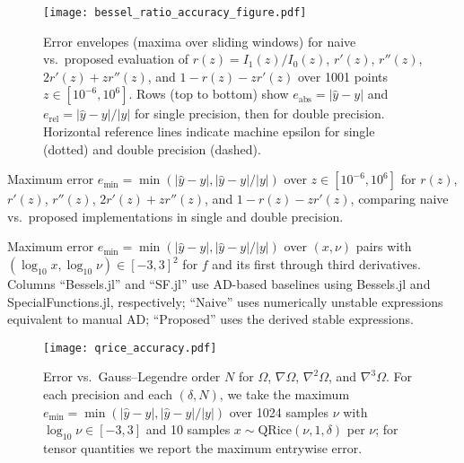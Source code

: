 \documentclass{article}
\begin{document}
\begin{figure}[t]
  \centering
  \texttt{[image: bessel\_ratio\_accuracy\_figure.pdf]}
  \caption{Error envelopes (maxima over sliding windows) for naive vs.\ proposed evaluation of $r(z) = I_1(z)/I_0(z)$, $r'(z)$, $r''(z)$, $2 r'(z) + z r''(z)$, and $1 - r(z) - z r'(z)$ over 1001 points $z \in [10^{-6}, 10^{6}]$. Rows (top to bottom) show $e_{\mathrm{abs}} = |\hat{y} - y|$ and $e_{\mathrm{rel}} = |\hat{y} - y| / |y|$ for single precision, then for double precision. Horizontal reference lines indicate machine epsilon for single (dotted) and double precision (dashed).}
  \label{fig:bessel-accuracy}
\end{figure}

\begin{table}[t]
  \centering
  
  \caption{Maximum error $e_{\min} = \min(|\hat{y} - y|, |\hat{y} - y| / |y|)$ over $z \in [10^{-6}, 10^{6}]$ for $r(z)$, $r'(z)$, $r''(z)$, $2 r'(z) + z r''(z)$, and $1 - r(z) - z r'(z)$, comparing naive vs.\ proposed implementations in single and double precision.}
  \label{fig:bessel-table}
\end{table}

\begin{table}[t]
  \centering
  \resizebox{\textwidth}{!}{}
  \caption{Maximum error $e_{\min} = \min(|\hat{y} - y|, |\hat{y} - y| / |y|)$ over $(x, \nu)$ pairs with $(\log_{10} x, \log_{10} \nu) \in [-3, 3]^2$ for $f$ and its first through third derivatives. Columns ``Bessels.jl'' and ``SF.jl'' use AD-based baselines using Bessels.jl and SpecialFunctions.jl, respectively; ``Naive'' uses numerically unstable expressions equivalent to manual AD; ``Proposed'' uses the derived stable expressions.}
  \label{fig:nll-table}
\end{table}

\begin{figure}[t]
  \centering
  \texttt{[image: qrice\_accuracy.pdf]}
  \caption{Error vs.\ Gauss--Legendre order $N$ for $\Omega$, $\nabla\Omega$, $\nabla^2\Omega$, and $\nabla^3\Omega$. For each precision and each $(\delta, N)$, we take the maximum $e_{\min} = \min(|\hat{y} - y|, |\hat{y} - y| / |y|)$ over 1024 samples $\nu$ with $\log_{10}\nu \in [-3, 3]$ and 10 samples $x \sim \mathrm{QRice}(\nu, 1, \delta)$ per $\nu$; for tensor quantities we report the maximum entrywise error.}
  \label{fig:qrice-accuracy}
\end{figure}
\end{document}
